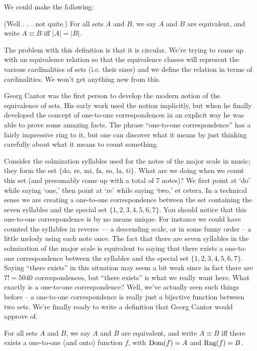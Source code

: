 We could make the following:
\begin{defi}
(Well . . . not quite.) For all sets $A$ and $B$, we say $A$ and $B$ are
equivalent, and write $A \equiv B$ iff $|A| = |B|$.
\end{defi}

The problem with this definition is that it is circular. We're trying to
come up with an equivalence relation so that the equivalence classes will
represent the various cardinalities of sets (i.e. their sizes) and we 
define the relation in terms of cardinalities. We won't get anything new 
from this.

Georg Cantor was the first person to develop the modern notion of the
equivalence of sets. His early work used the notion implicitly, but when he
finally developed the concept of one-to-one correspondences in an explicit
way he was able to prove some amazing facts. The phrase ``one-to-one correspondence''
has a fairly impressive ring to it, but one can discover what it
means by just thinking carefully about what it means to count something.

Consider the solmization syllables used for the notes of the major scale
in music; they form the set $\{\mbox{do, re, mi, fa, so, la, ti}\}$. 
What are we doing when
we count this set (and presumably come up with a total of 7 notes)? We first
point at `do' while saying `one,' then point at `re' while saying `two,' 
et cetera.
In a technical sense we are creating a one-to-one correspondence between the
set containing the seven syllables and the special set $\{1, 2, 3, 4, 5, 6, 7\}$. You should notice that this one-to-one correspondence is by no means unique. For
instance we could have counted the syllables in reverse --- a descending scale,
or in some funny order -- a little melody using each note once. The fact that
there are seven syllables in the solmization of the major scale is equivalent
to saying that there exists a one-to-one correspondence between the syllables
and the special set $\{1, 2, 3, 4, 5, 6, 7\}$.  Saying ``there exists'' in this situation may seem a bit weak since in fact there are $7! = 5040$ correspondences, but ``there exists'' is what we really want here. What exactly is a one-to-one
correspondence? Well, we've actually seen such things before -- a one-to-one
correspondence is really just a bijective function between two sets. We're
finally ready to write a definition that Georg Cantor would approve of.

\begin{defi}
For all sets $A$ and $B$, we say $A$ and $B$ are equivalent, and write
$A \equiv B$ iff there exists a one-to-one (and onto) function $f$, with $\mbox{Dom}(f) = A$ and $\mbox{Rng}(f) = B$.
\end{defi}

